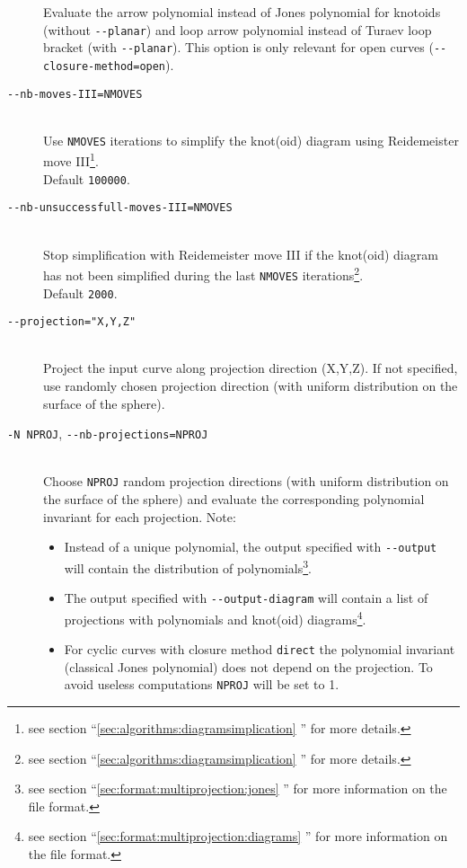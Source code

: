 \begin{description}
  Evaluate the arrow polynomial instead of Jones polynomial for knotoids (without \lstinline{--planar}) and loop arrow polynomial instead of Turaev loop bracket (with \lstinline{--planar}). This option is only relevant for open curves (\lstinline{--closure-method=open}).
\item[\lstinline{--nb-moves-III=NMOVES}]\hfill\\
  Use \lstinline{NMOVES} iterations to simplify the knot(oid) diagram using Reidemeister move III\footnote{see section  ``\ref{sec:algorithms:diagramsimplication} '' for more details.}.\\
  Default \lstinline{100000}.
\item[\lstinline{--nb-unsuccessfull-moves-III=NMOVES}]\hfill\\
  Stop simplification with Reidemeister move III if the knot(oid) diagram has not been simplified during the last \lstinline{NMOVES} iterations\footnote{see section  ``\ref{sec:algorithms:diagramsimplication} '' for more details.}.\\
  Default \lstinline{2000}.
\item[\lstinline{--projection="X,Y,Z"}]\hfill\\ Project the input curve along projection direction (X,Y,Z). If not specified, use randomly chosen projection direction (with uniform distribution on the surface of the sphere).
\item[\lstinline{-N NPROJ}, \lstinline{--nb-projections=NPROJ}]\hfill\\
  Choose \lstinline{NPROJ} random projection directions (with uniform distribution on the surface of the sphere) and evaluate the corresponding polynomial invariant for each projection. Note:
  \begin{itemize}
  \item Instead of a unique polynomial, the output specified with \lstinline{--output} will contain the distribution of polynomials\footnote{see section ``\ref{sec:format:multiprojection:jones} '' for more information on the file format.}. 
    \item The output specified with \lstinline{--output-diagram} will contain a list of projections with polynomials and knot(oid) diagrams\footnote{see section ``\ref{sec:format:multiprojection:diagrams} '' for more information on the file format.}.
    \item For cyclic curves with closure method \lstinline{direct} the polynomial invariant (classical Jones polynomial) does not depend on the projection. To avoid useless computations \lstinline{NPROJ} will be set to 1.

\end{itemize}
\end{description}
